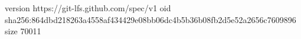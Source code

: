 version https://git-lfs.github.com/spec/v1
oid sha256:864dbd218263a4558af434429e08bb06dc4b5b36b08fb2d5e52a2656c7609896
size 70011
